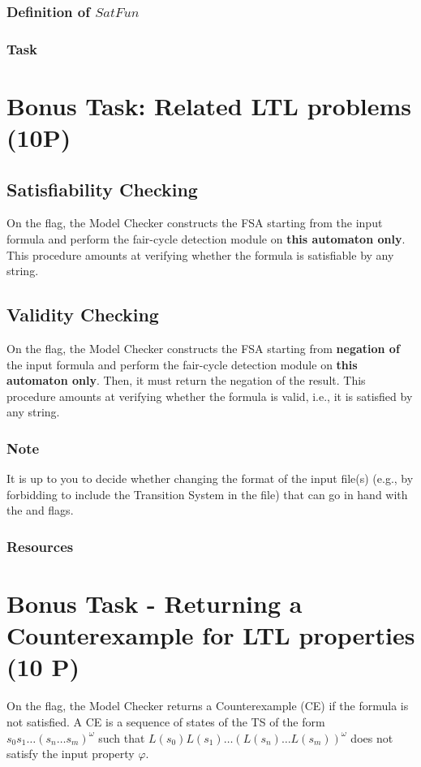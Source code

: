 \documentclass{article}
\begin{document}
\subsubsection*{Definition of $SatFun$}


\subsubsection*{Task}


\section{Bonus Task: Related LTL problems (10P)} \label{sec::bonus1}

\subsection{Satisfiability Checking}
On the  flag, the Model Checker constructs the FSA starting from the input formula
and perform the fair-cycle detection module on \textbf{this automaton only}. 
This procedure amounts at verifying whether the formula is satisfiable by any string. 

\subsection{Validity Checking}
On the  flag, the Model Checker constructs the FSA starting from \textbf{negation of} 
the input formula and perform the fair-cycle detection module on \textbf{this automaton only}. 
Then, it must return the negation of the result.
This procedure amounts at verifying whether the formula is valid, i.e., it is satisfied by any string. 

\subsubsection*{Note}
It is up to you to decide whether changing the format of the input file(s)
(e.g., by forbidding to include the Transition System in the file) 
that can go in hand with the  and  flags.

\subsubsection*{Resources}
\cite[Paragraph 5.2.2]{BaKa}

\section{Bonus Task - Returning a Counterexample for LTL properties (10 P)} \label{sec::bonus2}
On the  flag, the Model Checker returns a Counterexample (CE) if the formula is 
not satisfied. A CE is a sequence of states of the TS of the form $s_0s_1 \dots (s_n \dots s_m )^{\omega}$
such that $L(s_0)L(s_1) \dots (L(s_n) \dots L(s_m) )^{\omega}$ does not satisfy the input property $\varphi$.
\end{document}
